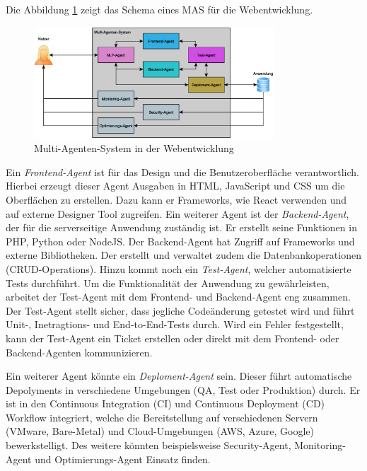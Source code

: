 Die Abbildung \ref{img:mas_web_development_schema} zeigt das Schema eines MAS für die Webentwicklung.

\begin{center}
	\begin{figure}[!ht]
		\includegraphics[width=0.8\textwidth]{content/chapter_basics/images/mas_web_development_schema.eps}
		\centering
		\caption{Multi-Agenten-System in der Webentwicklung}
		\label{img:mas_web_development_schema}
	\end{figure}
\end{center}

Ein \textit{Frontend-Agent} ist für das Design und die Benutzeroberfläche verantwortlich. Hierbei erzeugt dieser Agent Ausgaben in HTML, JavaScript und CSS um die Oberflächen zu erstellen. Dazu kann er Frameworks, wie React verwenden und auf externe Designer Tool zugreifen. Ein weiterer Agent ist der \textit{Backend-Agent}, der für die serverseitige Anwendung zuständig ist. Er erstellt seine Funktionen in PHP, Python oder NodeJS. Der Backend-Agent hat Zugriff auf Frameworks und externe Bibliotheken. Der erstellt und verwaltet zudem die Datenbankoperationen (CRUD-Operations). Hinzu kommt noch ein \textit{Test-Agent}, welcher automatisierte Tests durchführt. Um die Funktionalität der Anwendung zu gewährleisten, arbeitet der Test-Agent mit dem Frontend- und Backend-Agent eng zusammen. Der Test-Agent stellt sicher, dass jegliche Codeänderung getestet wird und führt Unit-, Inetragtions- und End-to-End-Tests durch. Wird ein Fehler festgestellt, kann der Test-Agent ein Ticket erstellen oder direkt mit dem Frontend- oder Backend-Agenten kommunizieren.\vspace{0.2cm}

Ein weiterer Agent könnte ein \textit{Deploment-Agent} sein. Dieser führt automatische Depolyments in verschiedene Umgebungen (QA, Test oder Produktion) durch. Er ist in den Continuous Integration (CI) und Continuous Deployment (CD) Workflow integriert, welche die Bereitstellung auf verschiedenen Servern (VMware, Bare-Metal) und Cloud-Umgebungen (AWS, Azure, Google) bewerkstelligt. Des weitere könnten beispielsweise Security-Agent, Monitoring-Agent und Optimierungs-Agent Einsatz finden.\vspace{0.2cm}

